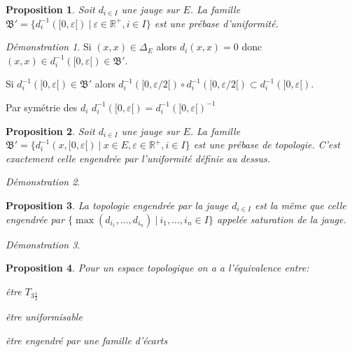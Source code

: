 \documentclass[a4paper, 11pt, french]{book}
\newenvironment{itemise}{\itemize}{\enditemize}
\theoremstyle{plain} %
\newtheorem{proposition}{Proposition}
\theoremstyle{definition} %
\theoremstyle{remark} %
\newtheorem*{demonstration}{Démonstration}
\newcommand{\1}{\mathds{1}}
\newcommand{\inv}[1]{#1^{-1}}
\newcommand{\R}{\mathbb{R}}
\newcommand\ens[2]{\{#1 \ |\ #2\}}
\begin{document}
\begin{proposition}
	Soit $d_{i\in I}$ une jauge sur $E$.
	La famille $\mathfrak{B}'=\ens{\inv{d_i}([0, \varepsilon[)}{\varepsilon\in\R^+, i\in I}$ est une prébase d'uniformité.
\end{proposition}

\begin{demonstration}
	\begin{itemise}
		\item Si $(x, x)\in\Delta_E$ alors $d_i(x, x)=0$ donc $(x, x)\in\inv{d_i}([0, \varepsilon[)\in\mathfrak{B}'$.
		\item Si $\inv{d_i}([0, \varepsilon[)\in\mathfrak{B}'$ alors $\inv{d_i}([0, \varepsilon/2[)\circ \inv{d_i}([0, \varepsilon/2[)\subset\inv{d_i}([0, \varepsilon[)$.
		\item Par symétrie des $d_i$ $\inv{d_i}([0, \varepsilon[)=\inv{\inv{d_i}([0, \varepsilon[)}$
	\end{itemise}
\end{demonstration}

\begin{proposition}
	Soit $d_{i\in I}$ une jauge sur $E$.
	La famille $\mathfrak{B}'=\ens{\inv{d_i}(x, [0, \varepsilon[)}{x\in E, \varepsilon\in\R^+, i\in I}$ est une prébase de topologie.
	C'est exactement celle engendrée par l'uniformité définie au dessus.
\end{proposition}

\begin{demonstration}
\end{demonstration}

\begin{proposition}
	La topologie engendrée par la jauge $d_{i\in I}$ est la même que celle engendrée par $\ens{\max(d_{i_1}, ..., d_{i_n})}{i_1, ..., i_n\in I}$ appelée saturation de la jauge.
\end{proposition}

\begin{demonstration}
\end{demonstration}

\begin{proposition}
	Pour un espace topologique on a a l'équivalence entre:
	\begin{itemise}
		\item être $T_{3\frac{1}{2}}$
		\item être uniformisable
		\item être engendré par une famille d'écarts
	\end{itemise}
\end{proposition}
\end{document}

